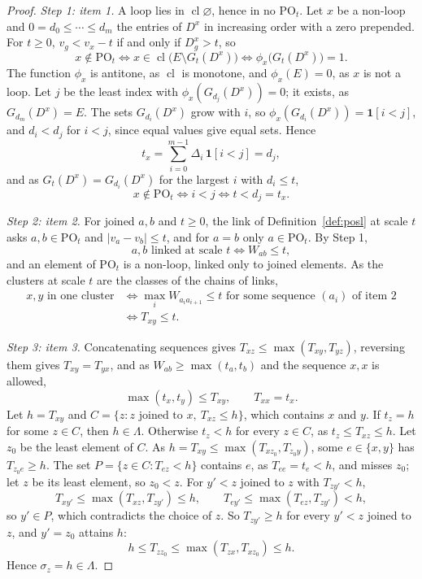 \documentclass[11pt]{article}
\newcommand{\cl}{\operatorname{cl}}
\newcommand{\PO}{\mathrm{PO}}
\begin{document}
\begin{proof}
\emph{Step 1: item 1.}  A loop lies in $\cl\varnothing$, hence in no $\PO_t$.
Let $x$ be a non-loop and $0=d_0\le\cdots\le d_m$ the entries of $D^{x}$ in
increasing order with a zero prepended.  For $t\ge0$, $v_g<v_x-t$ if and only if
$D^{x}_g>t$, so
\[
  x\notin\PO_t\iff x\in\cl\bigl(E\setminus G_t(D^{x})\bigr)\iff\phi_x\bigl(G_t(D^{x})\bigr)=1.
\]
The function $\phi_x$ is antitone, as $\cl$ is monotone, and $\phi_x(E)=0$, as $x$ is
not a loop.  Let $j$ be the least index with $\phi_x(G_{d_j}(D^{x}))=0$; it exists,
as $G_{d_m}(D^{x})=E$.  The sets $G_{d_i}(D^{x})$ grow with $i$, so
$\phi_x(G_{d_i}(D^{x}))=\mathbf 1[i<j]$, and $d_i<d_j$ for $i<j$, since equal values
give equal sets.  Hence
\[
  t_x=\sum_{i=0}^{m-1}\Delta_i\,\mathbf 1[i<j]=d_j,
\]
and as $G_t(D^{x})=G_{d_i}(D^{x})$ for the largest $i$ with $d_i\le t$,
\[
  x\notin\PO_t\iff i<j\iff t<d_j=t_x.
\]

\emph{Step 2: item 2.}  For joined $a,b$ and $t\ge0$, the link of
Definition~\ref{def:posl} at scale $t$ asks $a,b\in\PO_t$ and $|v_a-v_b|\le t$, and
for $a=b$ only $a\in\PO_t$.  By Step 1,
\[
  a,b\text{ linked at scale }t\iff W_{ab}\le t,
\]
and an element of $\PO_t$ is a non-loop, linked only to joined elements.  As the
clusters at scale $t$ are the classes of the chains of links,
\[
  \begin{aligned}
  x,y\text{ in one cluster}
  &\iff\max_iW_{a_ia_{i+1}}\le t\text{ for some sequence }(a_i)\text{ of item 2}\\
  &\iff T_{xy}\le t.
  \end{aligned}
\]

\emph{Step 3: item 3.}  Concatenating sequences gives
$T_{xz}\le\max(T_{xy},T_{yz})$, reversing them gives $T_{xy}=T_{yx}$, and as
$W_{ab}\ge\max(t_a,t_b)$ and the sequence $x,x$ is allowed,
\[
  \max(t_x,t_y)\le T_{xy},\qquad T_{xx}=t_x.
\]
Let $h=T_{xy}$ and $C=\{z:z\text{ joined to }x,\ T_{xz}\le h\}$, which contains $x$
and $y$.  If $t_z=h$ for some $z\in C$, then $h\in\Lambda$.  Otherwise $t_z<h$ for
every $z\in C$, as $t_z\le T_{xz}\le h$.  Let $z_0$ be the least element of $C$.  As
$h=T_{xy}\le\max(T_{xz_0},T_{z_0y})$, some $e\in\{x,y\}$ has $T_{z_0e}\ge h$.  The set
$P=\{z\in C:T_{ez}<h\}$ contains $e$, as $T_{ee}=t_e<h$, and misses $z_0$; let $z$ be
its least element, so $z_0<z$.  For $y'<z$ joined to $z$ with $T_{zy'}<h$,
\[
  T_{xy'}\le\max(T_{xz},T_{zy'})\le h,\qquad T_{ey'}\le\max(T_{ez},T_{zy'})<h,
\]
so $y'\in P$, which contradicts the choice of $z$.  So $T_{zy'}\ge h$ for every
$y'<z$ joined to $z$, and $y'=z_0$ attains $h$:
\[
  h\le T_{zz_0}\le\max(T_{zx},T_{xz_0})\le h.
\]
Hence $\sigma_z=h\in\Lambda$.


\end{proof}
\end{document}
